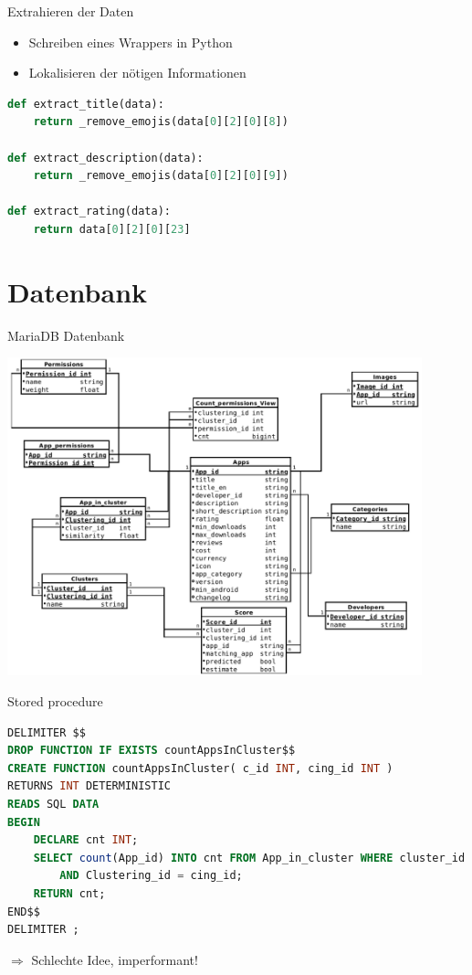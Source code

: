 \documentclass[compress,t]{beamer}
\begin{document}
\begin{frame}[fragile]{Extrahieren der Daten}
    \begin{itemize}
        \item Schreiben eines Wrappers in Python
        \item Lokalisieren der nötigen Informationen
    \end{itemize}

    \begin{lstlisting}[language=Python]
def extract_title(data):
    return _remove_emojis(data[0][2][0][8])

def extract_description(data):
    return _remove_emojis(data[0][2][0][9])

def extract_rating(data):
    return data[0][2][0][23]
    \end{lstlisting}

\end{frame}

\section{Datenbank}

\begin{frame}{MariaDB Datenbank}

    \begin{center}
        \includegraphics[width=0.9\textwidth]{img/Scheme_extended_3.png}
    \end{center}

\end{frame}

\begin{frame}[fragile]{Stored procedure}

    \begin{lstlisting}[language=SQL]
DELIMITER $$
DROP FUNCTION IF EXISTS countAppsInCluster$$
CREATE FUNCTION countAppsInCluster( c_id INT, cing_id INT )
RETURNS INT DETERMINISTIC
READS SQL DATA
BEGIN
    DECLARE cnt INT;
    SELECT count(App_id) INTO cnt FROM App_in_cluster WHERE cluster_id = c_id
        AND Clustering_id = cing_id;
    RETURN cnt;
END$$
DELIMITER ;
    \end{lstlisting}

    \(\Rightarrow\) Schlechte Idee, imperformant!

\end{frame}
\end{document}

